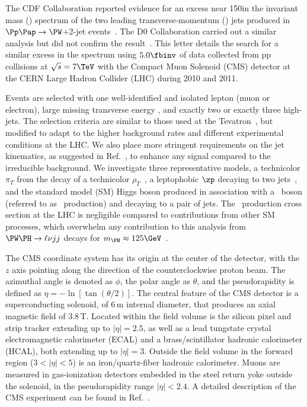 
The CDF Collaboration reported evidence for an excess near 150\GeV in
the invariant mass (\mjj) spectrum of the two
leading transverse-momentum (\pt) jets produced in
$\Pp\Pap\rightarrow\PW$+2-jet events~\cite{CDFresult}.  The
D0 Collaboration carried out a similar analysis but did not confirm
the result~\cite{D0result}.  This letter details the search for a
similar excess in the \mjj spectrum using $5.0\fbinv$ of data
collected from pp collisions at $\sqrt{s} = 7\TeV$ with the Compact
Muon Solenoid (CMS) detector at the CERN Large Hadron Collider (LHC)
during 2010 and 2011.

Events are selected with one well-identified and isolated lepton (muon
or electron), large missing transverse energy \met, and exactly two or
exactly three high-\pt jets.  The selection criteria are similar to
those used at the Tevatron~\cite{CDFresult,D0result}, but modified to
adapt to the higher background rates and different experimental
conditions at the LHC.  We also place more stringent requirements on
the jet kinematics, as suggested in Ref.~\cite{ELM}, to enhance any
signal compared to the irreducible \Wpj background.  We investigate
three representative models, a technicolor $\pi_T$ from the decay of a
technicolor $\rho_T$~\cite{Eichten:2011sh}, a leptophobic $\zp$
decaying to two jets~\cite{Buckley:2011vc}, and the standard model
(SM) Higgs boson produced in association with a \PW\ boson (referred to
as \PW\PH\ production) and decaying to a pair of jets.  The \PW\PH\ production
cross section at the LHC is negligible compared to contributions from
other SM processes, which overwhelm any contribution to this analysis
from $\PW\PH\rightarrow \ell\nu jj$ decays for $m_{\PH}\approx
125\GeV$~\cite{CMSHiggs,ATLASHiggs}.


The CMS coordinate system has its origin at the center of the
detector, with the $z$ axis pointing along the direction of the
counterclockwise proton beam. The azimuthal angle is denoted as
$\phi$, the polar angle as $\theta$, and the pseudorapidity is defined
as $\eta=-\ln\left[\tan\left(\theta/2\right)\right]$.  The central
feature of the CMS detector is a superconducting solenoid, of 6\,m
internal diameter, that produces an axial magnetic field of
3.8\,T. Located within the field volume is the silicon pixel and strip
tracker extending up to $|\eta|=2.5$, as well as a lead tungstate
crystal electromagnetic calorimeter (ECAL) and a brass/scintillator
hadronic calorimeter (HCAL), both extending up to $|\eta| =3$.
Outside the field volume in the forward region ($3 < |\eta| < 5$) is
an iron/quartz-fiber hadronic calorimeter.  Muons are measured in
gas-ionization detectors embedded in the steel return yoke outside the
solenoid, in the pseudorapidity range $|\eta| < 2.4$.  A detailed
description of the CMS experiment can be found in
Ref.~\cite{CMSDetector}.



